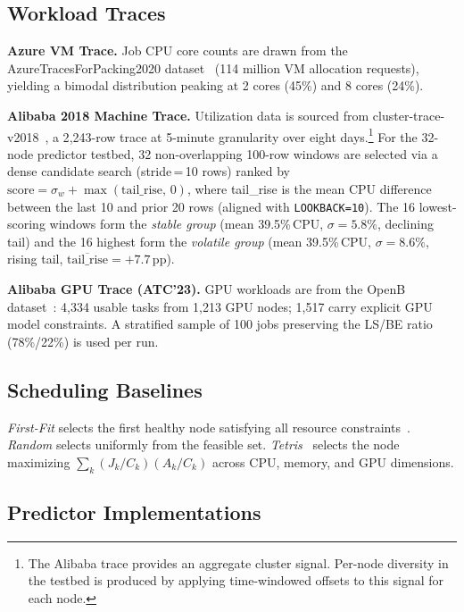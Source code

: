 \documentclass[conference]{IEEEtran}
\begin{document}
\subsection{Workload Traces}

\textbf{Azure VM Trace.} Job CPU core counts are drawn from the
AzureTracesForPacking2020 dataset~\cite{hadary2020protean} (114 million VM
allocation requests), yielding a bimodal distribution peaking at 2 cores
(45\%) and 8 cores (24\%).

\textbf{Alibaba 2018 Machine Trace.} Utilization data is sourced from
cluster-trace-v2018~\cite{alibaba2018trace}, a 2{,}243-row trace at
5-minute granularity over eight days.\footnote{The Alibaba trace provides
an aggregate cluster signal. Per-node diversity in the testbed is produced
by applying time-windowed offsets to this signal for each node.} For the
32-node predictor testbed, 32 non-overlapping 100-row windows are selected
via a dense candidate search (stride\,=\,10 rows) ranked by
$\text{score} = \sigma_w + \max(\text{tail\_rise},\, 0)$, where
tail\_rise is the mean CPU difference between the last 10 and prior 20
rows (aligned with \texttt{LOOKBACK=10}). The 16 lowest-scoring windows
form the \emph{stable group} (mean 39.5\%\,CPU, $\sigma{=}5.8\%$,
declining tail) and the 16 highest form the \emph{volatile group}
(mean 39.5\%\,CPU, $\sigma{=}8.6\%$, rising tail,
$\overline{\text{tail\_rise}}{=}{+}7.7$\,pp).

\textbf{Alibaba GPU Trace (ATC'23).} GPU workloads are from the OpenB
dataset~\cite{weng2023beware}: 4{,}334 usable tasks from 1{,}213 GPU
nodes; 1{,}517 carry explicit GPU model constraints. A stratified sample
of 100 jobs preserving the LS/BE ratio (78\%/22\%) is used per run.

\subsection{Scheduling Baselines}

\textit{First-Fit} selects the first healthy node satisfying all resource
constraints~\cite{verma2015borg}. \textit{Random} selects uniformly from
the feasible set. \textit{Tetris}~\cite{grandl2014tetris} selects the node
maximizing $\sum_k (J_k/C_k)(A_k/C_k)$ across CPU, memory, and GPU
dimensions.

\subsection{Predictor Implementations}
\label{subsec:roster}
\end{document}
